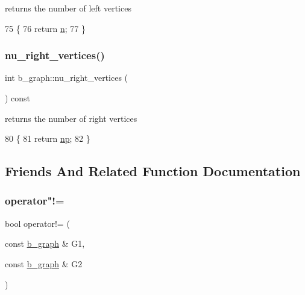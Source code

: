 returns the number of left vertices 


\begin{DoxyCode}
75 \{
76   \textcolor{keywordflow}{return} \hyperlink{classb__graph_a9e211d40c1799bc9b125de472ff06642}{n};
77 \}
\end{DoxyCode}
\mbox{\label{classb__graph_abecfd7d6fbd0d9a554fe0d9aa3241a04}} 
\subsubsection{\texorpdfstring{nu\+\_\+right\+\_\+vertices()}{nu\_right\_vertices()}}
{\footnotesize\ttfamily int b\+\_\+graph\+::nu\+\_\+right\+\_\+vertices (\begin{DoxyParamCaption}{ }\end{DoxyParamCaption}) const}



returns the number of right vertices 


\begin{DoxyCode}
80 \{
81   \textcolor{keywordflow}{return} \hyperlink{classb__graph_acffdd5f20329515eb6ec17ad24f1ca64}{np};
82 \}
\end{DoxyCode}


\subsection{Friends And Related Function Documentation}
\mbox{\label{classb__graph_ab90cd92a2e8f077e4ae18c568bcddd1a}} 
\subsubsection{\texorpdfstring{operator"!=}{operator!=}}
{\footnotesize\ttfamily bool operator!= (\begin{DoxyParamCaption}\item[{const \hyperlink{classb__graph}{b\+\_\+graph} \&}]{G1,  }\item[{const \hyperlink{classb__graph}{b\+\_\+graph} \&}]{G2 }\end{DoxyParamCaption})\hspace{0.3cm}{\ttfamily [friend]}}



